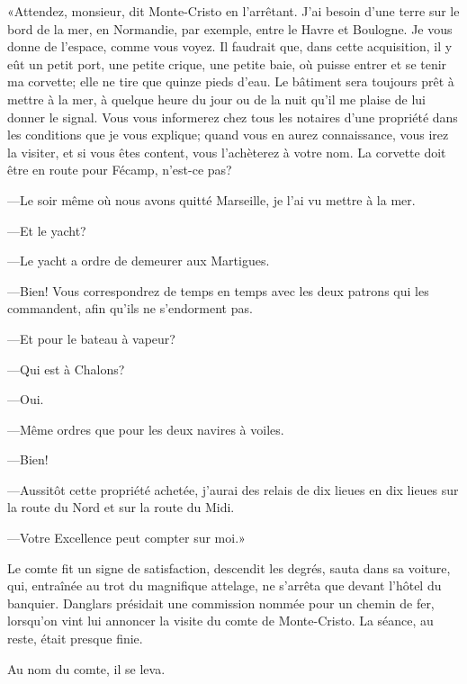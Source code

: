«Attendez, monsieur, dit Monte-Cristo en l'arrêtant. J'ai besoin d'une terre sur le bord de la mer, en Normandie, par exemple, entre le Havre et Boulogne. Je vous donne de l'espace, comme vous voyez. Il faudrait que, dans cette acquisition, il y eût un petit port, une petite crique, une petite baie, où puisse entrer et se tenir ma corvette; elle ne tire que quinze pieds d'eau. Le bâtiment sera toujours prêt à mettre à la mer, à quelque heure du jour ou de la nuit qu'il me plaise de lui donner le signal. Vous vous informerez chez tous les notaires d'une propriété dans les conditions que je vous explique; quand vous en aurez connaissance, vous irez la visiter, et si vous êtes content, vous l'achèterez à votre nom. La corvette doit être en route pour Fécamp, n'est-ce pas? 

—Le soir même où nous avons quitté Marseille, je l'ai vu mettre à la mer. 

—Et le yacht? 

—Le yacht a ordre de demeurer aux Martigues. 

—Bien! Vous correspondrez de temps en temps avec les deux patrons qui les commandent, afin qu'ils ne s'endorment pas. 

—Et pour le bateau à vapeur? 

—Qui est à Chalons? 

—Oui. 

—Même ordres que pour les deux navires à voiles. 

—Bien! 

—Aussitôt cette propriété achetée, j'aurai des relais de dix lieues en dix lieues sur la route du Nord et sur la route du Midi. 

—Votre Excellence peut compter sur moi.» 

Le comte fit un signe de satisfaction, descendit les degrés, sauta dans sa voiture, qui, entraînée au trot du magnifique attelage, ne s'arrêta que devant l'hôtel du banquier. Danglars présidait une commission nommée pour un chemin de fer, lorsqu'on vint lui annoncer la visite du comte de Monte-Cristo. La séance, au reste, était presque finie. 

Au nom du comte, il se leva. 

